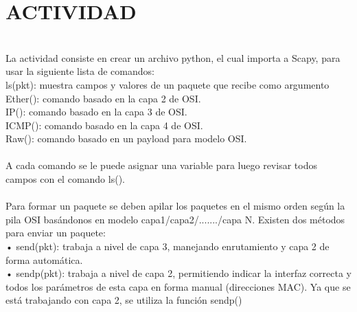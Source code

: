 \documentclass[onecolumn,12pt]{IEEEtran}
\begin{document}
\section{ACTIVIDAD}
\hfill \\
La actividad consiste en crear un archivo python, el cual importa a Scapy, para usar la siguiente lista de comandos:\\
ls(pkt): muestra campos y valores de un paquete que recibe como argumento \\
Ether(): comando basado en la capa 2 de OSI. \\
IP(): comando basado en la capa 3 de OSI. \\ 
ICMP(): comando basado en la capa 4 de OSI. \\
Raw(): comando basado en un payload para modelo OSI.\\ \\
A cada comando se le puede asignar una variable para luego revisar todos campos con el comando ls().\\ \\
Para formar un paquete se deben apilar los paquetes en el
mismo orden según la pila OSI basándonos en modelo capa1/capa2/......./capa N.
Existen dos métodos para enviar un paquete:\\
• send(pkt): trabaja a nivel de capa 3, manejando enrutamiento y capa 2 de forma automática.\\
• sendp(pkt): trabaja a nivel de capa 2, permitiendo indicar la interfaz correcta y todos los
parámetros de esta capa en forma manual (direcciones MAC).
Ya que se está trabajando con capa 2, se utiliza la función sendp()
\end{document}
